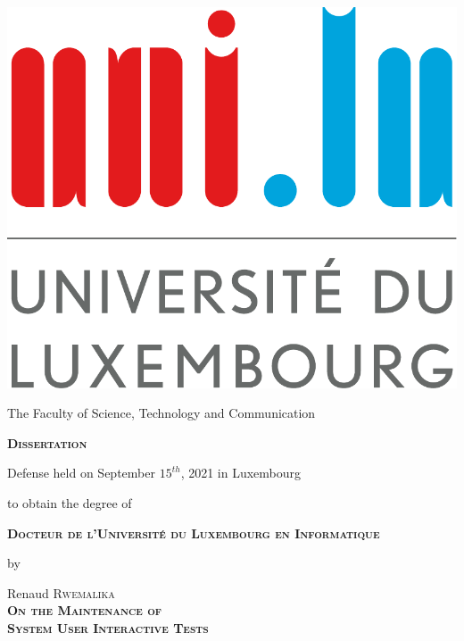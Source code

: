\thispagestyle{empty}

\begin{center}         
         \includegraphics[width=0.2\linewidth]{figures/logo/logoul.pdf}
         \vspace{0.3cm}\noindent
         
         The Faculty of Science, Technology and Communication
         
         \vspace{1cm}\noindent
         {\LARGE \textbf{\textsc{Dissertation}}}
         
         \vspace{0.5cm}
         \noindent
         Defense held on September $15^{th}$, 2021 in Luxembourg
         
         \vspace{0.5cm}\noindent
         to obtain the degree of
         
         \vspace{0.8cm}\noindent
         {\large \textbf{\textsc{Docteur de l'Université du Luxembourg en Informatique}}}

         \vspace{0.5cm}\noindent
         {\Large by}

         \vspace{0.5cm}\noindent
         {\Large Renaud \textsc{Rwemalika}}\\

         \vspace{1cm}\noindent
         {\LARGE \textbf{\textsc{On the Maintenance of}}}\\[0.4cm] 
         {\LARGE \textbf{\textsc{System User Interactive Tests}}}\\[0.4cm]
\end{center}

\vspace{0.4cm}

